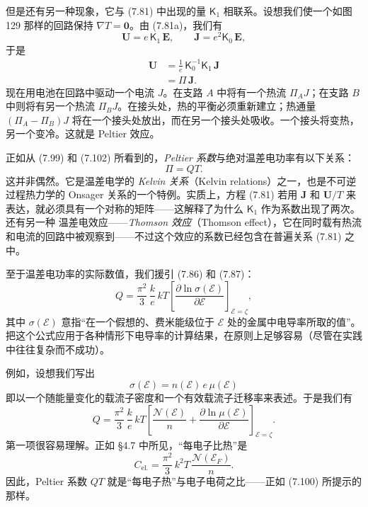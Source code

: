 
但是还有另一种现象，它与 (7.81) 中出现的量 $\mathsf{K}_{1}$ 相联系。设想我们使一个如图 129 那样的回路保持 $\nabla T=\mathbf{0}$。由 (7.81a)，我们有
\begin{equation*}
\mathbf{U}=e\,\mathsf{K}_{1}\,\mathbf{E},\qquad\mathbf{J}=e^{2}\mathsf{K}_{0}\,\mathbf{E},\tag{7.101}
\end{equation*}
于是
\begin{align*}
\mathbf{U}&=\frac{1}{e}\,\mathsf{K}_{0}^{-1}\mathsf{K}_{1}\,\mathbf{J}\\
&=\Pi\,\mathbf{J}.\tag{7.102}
\end{align*}
现在用电池在回路中驱动一个电流 $J$。在支路 $A$ 中将有一个热流 $\Pi_{A}J$；在支路 $B$ 中则将有另一个热流 $\Pi_{B}J$。在接头处，热的平衡必须重新建立；热通量 $(\Pi_{A}-\Pi_{B})J$ 将在一个接头处放出，而在另一个接头处吸收。一个接头将变热，另一个变冷。这就是 Peltier 效应。

正如从 (7.99) 和 (7.102) 所看到的，\emph{Peltier 系数}与绝对温差电功率有以下关系：
\begin{equation*}
\Pi=QT.\tag{7.103}
\end{equation*}
这并非偶然。它是温差电学的 \emph{Kelvin 关系}（Kelvin relations）之一，也是不可逆过程热力学的 Onsager 关系的一个特例。实质上，方程 (7.81) 若用 $\mathbf{J}$ 和 $\mathbf{U}/T$ 来表达，就必须具有一个对称的矩阵——这解释了为什么 $\mathsf{K}_{1}$ 作为系数出现了两次。还有另一种
温差电效应——\emph{Thomson 效应}（Thomson effect），它在同时载有热流和电流的回路中被观察到——不过这个效应的系数已经包含在普遍关系 (7.81) 之中。

至于温差电功率的实际数值，我们援引 (7.86) 和 (7.87)：
\begin{equation*}
Q=\frac{\pi^{2}}{3}\,\frac{k}{e}\,kT\left[\frac{\partial\ln\sigma(\mathcal{E})}{\partial\mathcal{E}}\right]_{\mathcal{E}=\zeta},\tag{7.104}
\end{equation*}
其中 $\sigma(\mathcal{E})$ 意指“在一个假想的、费米能级位于 $\mathcal{E}$ 处的金属中电导率所取的值”。把这个公式应用于各种情形下电导率的计算结果，在原则上足够容易（尽管在实践中往往复杂而不成功）。

例如，设想我们写出
\begin{equation*}
\sigma(\mathcal{E})=n(\mathcal{E})\,e\,\mu(\mathcal{E})\tag{7.105}
\end{equation*}
即以一个随能量变化的载流子密度和一个有效载流子迁移率来表述。于是我们有
\begin{equation*}
Q=\frac{\pi^{2}}{3}\,\frac{k}{e}\,kT\left[\frac{\mathcal{N}(\mathcal{E})}{n}+\frac{\partial\ln\mu(\mathcal{E})}{\partial\mathcal{E}}\right]_{\mathcal{E}=\zeta}.\tag{7.106}
\end{equation*}
第一项很容易理解。正如 §4.7 中所见，“每电子比热”是
\begin{equation*}
C_{\text{el.}}=\frac{\pi^{2}}{3}\,k^{2}T\,\frac{\mathcal{N}(\mathcal{E}_{F})}{n}.\tag{7.107}
\end{equation*}
因此，Peltier 系数 $QT$ 就是“每电子热”与电子电荷之比——正如 (7.100) 所提示的那样。

